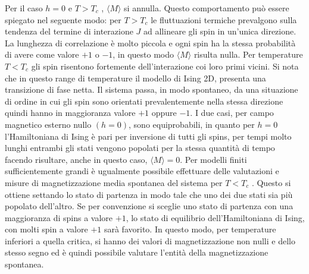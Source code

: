 \documentclass[a4paper,12pt]{article}
\begin{document}
Per il caso $h = 0$ e $T > T_c$ , $\langle M \rangle$ si annulla. Questo comportamento può essere spiegato nel seguente modo: per $T > T_c$ le fluttuazioni termiche prevalgono sulla tendenza del termine di interazione $J$ ad allineare gli spin in un'unica direzione. La lunghezza di correlazione è molto piccola e ogni spin ha la stessa probabilità di avere come valore $+1$ o $-1$, in questo modo $\langle M \rangle$ risulta nulla. Per temperature $T < T_c$ gli spin risentono fortemente dell’interazione coi loro primi vicini. Si nota che in questo range di temperature il modello di Ising 2D, presenta una transizione di fase netta. Il sistema passa, in modo spontaneo, da una situazione di ordine in cui gli spin sono orientati prevalentemente nella stessa direzione quindi hanno in maggioranza valore $+1$ oppure $-1$. I due casi, per campo magnetico esterno nullo $(h = 0)$, sono equiprobabili, in quanto per $h = 0$ l’Hamiltoniana di Ising è pari per inversione di tutti gli spins, per tempi molto lunghi entrambi gli stati vengono popolati per la stessa quantità di tempo facendo risultare, anche in questo caso, $\langle M \rangle = 0$. Per modelli finiti sufficientemente grandi è ugualmente possibile effettuare delle valutazioni e misure di magnetizzazione media spontanea del sistema per $T < T_c$ . Questo si ottiene settando lo stato di partenza in modo tale che uno dei due stati sia più popolato dell’altro. Se per convenzione si sceglie uno stato di partenza con una maggioranza di spins a valore $+1$, lo stato di equilibrio dell’Hamiltoniana di Ising, con molti spin a valore $+1$ sarà favorito. In questo modo, per temperature inferiori a quella critica, si hanno dei valori di magnetizzazione non nulli e dello stesso segno ed è quindi possibile valutare l’entità della magnetizzazione spontanea.
\end{document}

